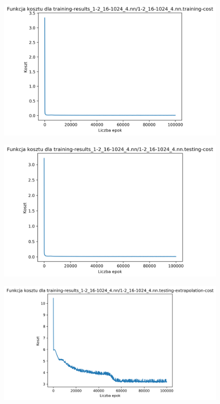 \documentclass{classrep}
\begin{document}
{{{\begin{figure}[!htbp]
                    \includegraphics[width=120mm]{wykresy/1-2_16-1024_4_nn_training-cost.png}
                \end{figure}
                \begin{figure}[!htbp]
                    \centering
                    \includegraphics[width=120mm]{wykresy/1-2_16-1024_4_nn_testing-cost.png}
                \end{figure}
                \begin{figure}[!htbp]
                    \centering
                    \includegraphics[width=140mm]{wykresy/1-2_16-1024_4_nn_testing-extrapolation-cost.png}

\end{figure}}}}
\end{document}
